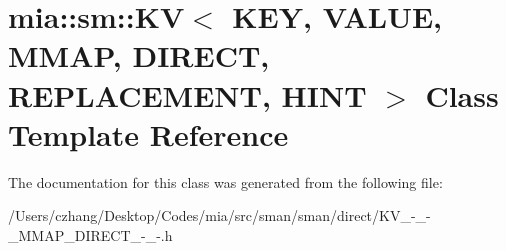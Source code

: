 \hypertarget{classmia_1_1sm_1_1_k_v_3_01_k_e_y_00_01_v_a_l_u_e_00_01_m_m_a_p_00_01_d_i_r_e_c_t_00_01_r_e_p_l_2c35447e93d2a07c32ca67010a09264b}{\section{mia\-:\-:sm\-:\-:K\-V$<$ K\-E\-Y, V\-A\-L\-U\-E, M\-M\-A\-P, D\-I\-R\-E\-C\-T, R\-E\-P\-L\-A\-C\-E\-M\-E\-N\-T, H\-I\-N\-T $>$ Class Template Reference}
\label{classmia_1_1sm_1_1_k_v_3_01_k_e_y_00_01_v_a_l_u_e_00_01_m_m_a_p_00_01_d_i_r_e_c_t_00_01_r_e_p_l_2c35447e93d2a07c32ca67010a09264b}
}


The documentation for this class was generated from the following file\-:\begin{DoxyCompactItemize}
\item 
/\-Users/czhang/\-Desktop/\-Codes/mia/src/sman/sman/direct/K\-V\-\_\--\/\-\_\--\/\-\_\-\-M\-M\-A\-P\-\_\-\-D\-I\-R\-E\-C\-T\-\_\--\/\-\_\--\/.\-h\end{DoxyCompactItemize}
